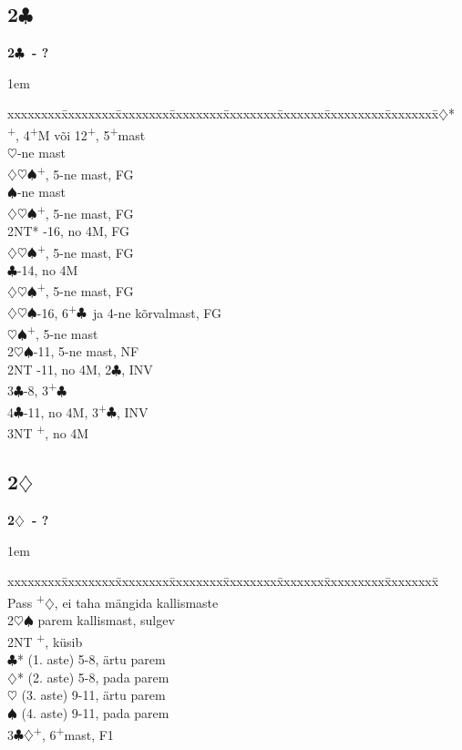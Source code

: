 \documentclass[10pt]{article}
\renewcommand{\c}{$\clubsuit$}
\renewcommand{\d}{$\diamondsuit$}
\newcommand{\h}{$\heartsuit$}
\newcommand{\s}{$\spadesuit$}
\newcommand{\p}{\textsuperscript{+}}
\newcommand{\m}{\textsuperscript{\textminus}}
\newenvironment{bidtable}[1][]
{\textbf{#1}
  \begin{adjustwidth}{1em}{}
    \addvspace{2pt}
    \begin{tabbing}
      xxxxxxxx\=xxxxxxxx\=xxxxxxxx\=xxxxxxxx\=xxxxxxxx\=xxxxxxx\=xxxxxxxxx\=xxxxxxxx\=\kill}
{\end{tabbing}\end{adjustwidth}\bigskip}%
\newcommand{\pdfc}{\texorpdfstring{\c{}}{C}}
\newcommand{\pdfd}{\texorpdfstring{\d{}}{D}}
\begin{document}

\newpage
\subsection{2\pdfc}

\begin{bidtable}[2\c\ - ?]
2\d*  {}\p, 4\p M või 12\p, 5\p mast                   \\
      \h   {}-ne mast                            \\
      \>         \d\h\s {}\p, 5-ne mast, FG       \\
      \s   {}-ne mast                            \\
      \>         \d\h\s {}\p, 5-ne mast, FG       \\
      \> 2NT*    -16, no 4M, FG                     \\
      \>         \d\h\s {}\p, 5-ne mast, FG       \\
      \c     {}-14, no 4M                         \\
      \>         \d\h\s {}\p, 5-ne mast, FG       \\
      \d\h\s {}-16, 6\p\c\ ja 4-ne kõrvalmast, FG \\
      \>         \h\s   {}\p, 5-ne mast           \\
2\h\s {}-11, 5-ne mast, NF                             \\
2NT   -11, no 4M, 2\m\c , INV                        \\
3\c   {}-8, 3\p\c                                      \\
4\c   {}-11, no 4M, 3\p\c , INV                        \\
3NT   \p, no 4M
\end{bidtable}

\subsection{2\pdfd}

\begin{bidtable}[2\d\ - ?]
Pass  \p\d , ei taha mängida kallismaste \\
2\h\s \> parem kallismast, sulgev            \\
2NT   \p , küsib                        \\
      \c* \> (1. aste) 5-8, ärtu parem   \\
      \d* \> (2. aste) 5-8, pada parem   \\
      \h  \> (3. aste) 9-11, ärtu parem  \\
      \s  \> (4. aste) 9-11, pada parem  \\
3\c\d {}\p , 6\p mast, F1
\end{bidtable}
\end{document}
